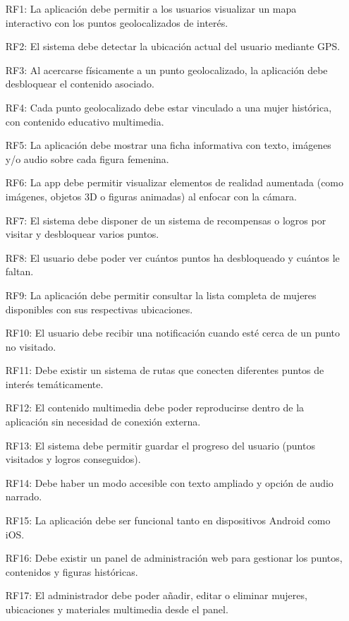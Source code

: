 \begin{itemize}
    \item[RF1:] La aplicación debe permitir a los usuarios visualizar un mapa interactivo con los puntos geolocalizados de interés.
    \item[RF2:] El sistema debe detectar la ubicación actual del usuario mediante GPS.
    \item[RF3:] Al acercarse físicamente a un punto geolocalizado, la aplicación debe desbloquear el contenido asociado.
    \item[RF4:] Cada punto geolocalizado debe estar vinculado a una mujer histórica, con contenido educativo multimedia.
    \item[RF5:] La aplicación debe mostrar una ficha informativa con texto, imágenes y/o audio sobre cada figura femenina.
    \item[RF6:] La app debe permitir visualizar elementos de realidad aumentada (como imágenes, objetos 3D o figuras animadas) al enfocar con la cámara.
    \item[RF7:] El sistema debe disponer de un sistema de recompensas o logros por visitar y desbloquear varios puntos.
    \item[RF8:] El usuario debe poder ver cuántos puntos ha desbloqueado y cuántos le faltan.
    \item[RF9:] La aplicación debe permitir consultar la lista completa de mujeres disponibles con sus respectivas ubicaciones.
    \item[RF10:] El usuario debe recibir una notificación cuando esté cerca de un punto no visitado.
    \item[RF11:] Debe existir un sistema de rutas que conecten diferentes puntos de interés temáticamente.
    \item[RF12:] El contenido multimedia debe poder reproducirse dentro de la aplicación sin necesidad de conexión externa.
    \item[RF13:] El sistema debe permitir guardar el progreso del usuario (puntos visitados y logros conseguidos).
    \item[RF14:] Debe haber un modo accesible con texto ampliado y opción de audio narrado.
    \item[RF15:] La aplicación debe ser funcional tanto en dispositivos Android como iOS.
    \item[RF16:] Debe existir un panel de administración web para gestionar los puntos, contenidos y figuras históricas.
    \item[RF17:] El administrador debe poder añadir, editar o eliminar mujeres, ubicaciones y materiales multimedia desde el panel.

\end{itemize}
